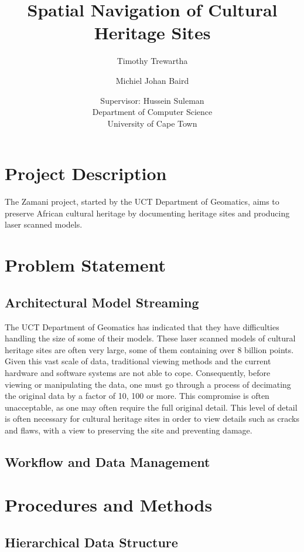 \documentclass[12pt,a4paper]{article}
\begin{document}
\author{Timothy Trewartha \\
\and		
Michiel Johan Baird \\
\and
Supervisor: Hussein Suleman \\
Department of Computer Science \\
University of Cape Town 
 }
\title{Spatial Navigation of Cultural Heritage Sites}
\maketitle
{}
\tableofcontents
\newpage

\section{Project Description}
The Zamani project, started by the UCT Department of Geomatics, aims to preserve African cultural heritage by documenting heritage sites and producing laser scanned models.
\section{Problem Statement}
\subsection{Architectural Model Streaming}
The UCT Department of Geomatics has indicated that they have difficulties handling the size of some of their models. These laser scanned models of cultural heritage sites are often very large, some of them containing over 8 billion points. Given this vast scale of data, traditional viewing methods and the current hardware and software systems are not able to cope.  Consequently, before viewing or manipulating the data, one must go through a process of decimating the original data by a factor of 10, 100 or more. This compromise is often unacceptable, as one may often require the full original detail. This level of detail is often necessary for cultural heritage sites in order to view details such as cracks and flaws, with a view to preserving the site and preventing damage.
\subsection{Workflow and Data Management}
\section{Procedures and Methods}
\subsection{Hierarchical Data Structure}
\end{document}
